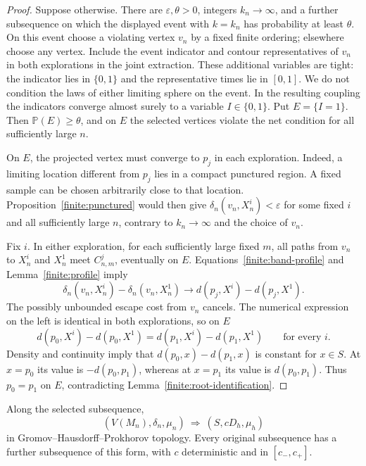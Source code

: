 \begin{proof}
Suppose otherwise.  There are \(\varepsilon,\theta>0\),
integers \(k_n\to\infty\), and a further subsequence on which
the displayed event with \(k=k_n\) has probability at least
\(\theta\).  On this event choose a violating vertex \(v_n\)
by a fixed finite ordering; elsewhere choose any vertex.
Include the event indicator and contour representatives of
\(v_n\) in both explorations in the joint extraction.
These additional variables are tight: the indicator lies
in \(\{0,1\}\) and the representative times lie in \([0,1]\).
We do not condition the laws of either limiting sphere on
the event.  In the resulting coupling the indicators
converge almost surely to a variable \(I\in\{0,1\}\).
Put \(E=\{I=1\}\).  Then \(\mathbb P(E)\ge\theta\), and on
\(E\) the selected vertices violate the net condition for
all sufficiently large \(n\).

On \(E\), the projected vertex must converge to \(p_j\) in
each exploration.  Indeed, a limiting location different
from \(p_j\) lies in a compact punctured region.  A fixed
sample can be chosen arbitrarily close to that location.
Proposition~\ref{finite:punctured} would then give
\(\delta_n(v_n,X_n^i)<\varepsilon\) for some fixed \(i\) and
all sufficiently large \(n\), contrary to \(k_n\to\infty\)
and the choice of \(v_n\).

Fix \(i\).  In either exploration, for each sufficiently
large fixed \(m\), all paths from \(v_n\) to \(X_n^i\) and
\(X_n^1\) meet \(C_{n,m}^j\), eventually on \(E\).
Equations~\eqref{finite:band-profile} and
Lemma~\ref{finite:profile} imply
\[
 \delta_n(v_n,X_n^i)-\delta_n(v_n,X_n^1)
       \longrightarrow d(p_j,X^i)-d(p_j,X^1).
\]
The possibly unbounded escape cost from \(v_n\) cancels.
The numerical expression on the left is identical in both
explorations, so on \(E\)
\[
 d(p_0,X^i)-d(p_0,X^1)
       =d(p_1,X^i)-d(p_1,X^1)
       \qquad\text{for every }i.
\]
Density and continuity imply that
\(d(p_0,x)-d(p_1,x)\) is constant for \(x\in S\).
At \(x=p_0\) its value is \(-d(p_0,p_1)\), whereas at
\(x=p_1\) its value is \(d(p_0,p_1)\).
Thus \(p_0=p_1\) on \(E\), contradicting
Lemma~\ref{finite:root-identification}.
\end{proof}

\begin{corollary}
\label{finite:subsequential}
Along the selected subsequence,
\[
                (V(M_n),\delta_n,\mu_n)
                      \ \Longrightarrow\ (S,cD_h,\mu_h)
\]
in Gromov--Hausdorff--Prokhorov topology.
Every original subsequence has a further subsequence of this
form, with \(c\) deterministic and in \([c_-,c_+]\).
\end{corollary}

